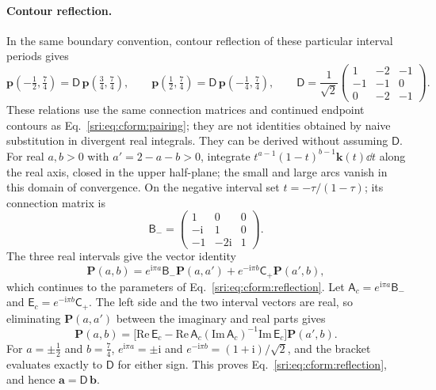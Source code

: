 \paragraph{Contour reflection.} In the same boundary convention, contour reflection of these particular interval
periods gives
\begin{equation}
 \mathbf p(-\tfrac12,\tfrac74)=\mathsf D\,\mathbf p(\tfrac34,\tfrac74),\qquad
 \mathbf p(\tfrac12,\tfrac74)=\mathsf D\,\mathbf p(-\tfrac14,\tfrac74),\qquad
 \mathsf D=\frac1{\sqrt2}\begin{pmatrix}1&-2&-1\\-1&-1&0\\0&-2&-1\end{pmatrix}.
 \label{sri:eq:cform:reflection}
\end{equation}
These relations use the same connection matrices and continued endpoint contours as Eq.~\eqref{sri:eq:cform:pairing};
they are not identities obtained by naive substitution in divergent real integrals. They can be derived without
assuming $\mathsf D$. For real $a,b>0$ with $a'=2-a-b>0$, integrate $t^{a-1}(1-t)^{b-1}\mathbf k(t)\dd t$ along the
real axis, closed in the upper half-plane; the small and large arcs vanish in this domain of convergence. On the
negative interval set $t=-\tau/(1-\tau)$; its connection matrix is
\begin{equation}
 \mathsf B_-=\begin{pmatrix}1&0&0\\-\mathrm i&1&0\\-1&-2\mathrm i&1\end{pmatrix}.
\end{equation}
The three real intervals give the vector identity
\begin{equation}
 \mathbf P(a,b)=e^{\mathrm i\pi a}\mathsf B_-\mathbf P(a,a')+e^{-\mathrm i\pi b}\mathsf C_+\mathbf P(a',b),
\end{equation}
which continues to the parameters of Eq.~\eqref{sri:eq:cform:reflection}. Let $\mathsf A_c=e^{\mathrm i\pi a}\mathsf B_-$ and
$\mathsf E_c=e^{-\mathrm i\pi b}\mathsf C_+$. The left side and the two interval vectors are real, so eliminating
$\mathbf P(a,a')$ between the imaginary and real parts gives
\begin{equation}
 \mathbf P(a,b)=\bigl[\mathrm{Re}\,\mathsf E_c-\mathrm{Re}\,\mathsf A_c(\mathrm{Im}\,\mathsf A_c)^{-1}\mathrm{Im}\,\mathsf E_c\bigr]
 \mathbf P(a',b).
\end{equation}
For $a=\pm\frac12$ and $b=\frac74$, $e^{\mathrm i\pi a}=\pm\mathrm i$ and $e^{-\mathrm i\pi b}=(1+\mathrm i)/\sqrt2$, and the
bracket evaluates exactly to $\mathsf D$ for either sign. This proves Eq.~\eqref{sri:eq:cform:reflection}, and hence
$\mathbf a=\mathsf D\,\mathbf b$.

